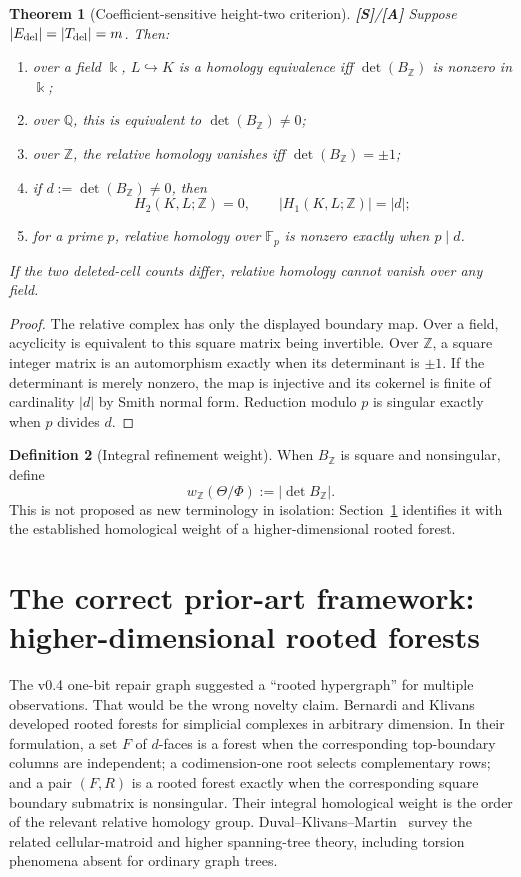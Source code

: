 \documentclass[11pt]{article}
\newtheorem{theorem}{Theorem}[section]
\theoremstyle{definition}
\newtheorem{definition}[theorem]{Definition}
\newcommand{\statusS}{\textbf{[S]}}
\newcommand{\statusA}{\textbf{[A]}}
\begin{document}
\begin{theorem}[Coefficient-sensitive height-two criterion]\label{thm:coeff}
\statusS/\statusA\;
Suppose $|E_{\rm del}|=|T_{\rm del}|=m$. Then:
\begin{enumerate}[label=(\roman*)]
\item over a field $\Bbbk$, $L\hookrightarrow K$ is a homology equivalence iff $\det(B_{\mathbb Z})$ is nonzero in $\Bbbk$;
\item over $\mathbb Q$, this is equivalent to $\det(B_{\mathbb Z})\ne0$;
\item over $\mathbb Z$, the relative homology vanishes iff $\det(B_{\mathbb Z})=\pm1$;
\item if $d:=\det(B_{\mathbb Z})\ne0$, then
\[
H_2(K,L;\mathbb Z)=0,
\qquad
|H_1(K,L;\mathbb Z)|=|d|;
\]
\item for a prime $p$, relative homology over $\mathbb F_p$ is nonzero exactly when $p\mid d$.
\end{enumerate}
If the two deleted-cell counts differ, relative homology cannot vanish over any field.
\end{theorem}

\begin{proof}
The relative complex has only the displayed boundary map. Over a field, acyclicity is equivalent to this square matrix being invertible. Over $\mathbb Z$, a square integer matrix is an automorphism exactly when its determinant is $\pm1$. If the determinant is merely nonzero, the map is injective and its cokernel is finite of cardinality $|d|$ by Smith normal form. Reduction modulo $p$ is singular exactly when $p$ divides $d$.
\end{proof}

\begin{definition}[Integral refinement weight]
When $B_{\mathbb Z}$ is square and nonsingular, define
\[
w_{\mathbb Z}(\Theta/\Phi):=|\det B_{\mathbb Z}|.
\]
This is not proposed as new terminology in isolation: Section~\ref{sec:rooted} identifies it with the established homological weight of a higher-dimensional rooted forest.
\end{definition}

\section{The correct prior-art framework: higher-dimensional rooted forests}\label{sec:rooted}

The v0.4 one-bit repair graph suggested a ``rooted hypergraph'' for multiple observations. That would be the wrong novelty claim. Bernardi and Klivans~\cite{BernardiKlivans2016} developed rooted forests for simplicial complexes in arbitrary dimension. In their formulation, a set $F$ of $d$-faces is a forest when the corresponding top-boundary columns are independent; a codimension-one root selects complementary rows; and a pair $(F,R)$ is a rooted forest exactly when the corresponding square boundary submatrix is nonsingular. Their integral homological weight is the order of the relevant relative homology group. Duval--Klivans--Martin~\cite{DuvalKlivansMartin2016} survey the related cellular-matroid and higher spanning-tree theory, including torsion phenomena absent for ordinary graph trees.
\end{document}
